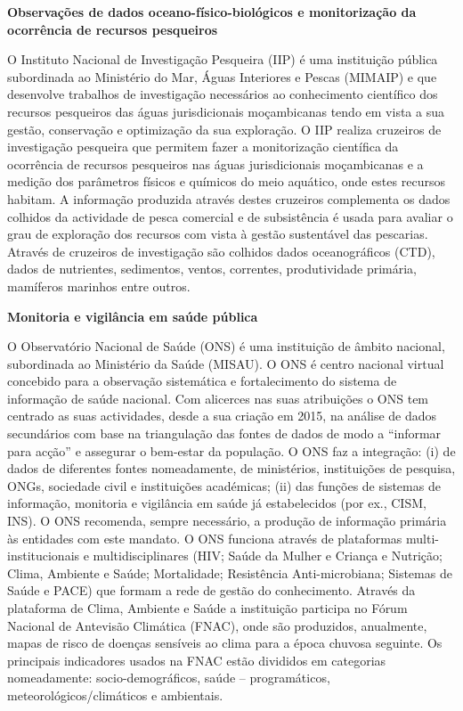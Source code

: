 \documentclass[
]{book}
\begin{document}
\textbf{Observações de dados oceano-físico-biológicos e monitorização da ocorrência de recursos pesqueiros}

O Instituto Nacional de Investigação Pesqueira (IIP) é uma instituição pública subordinada ao Ministério do Mar, Águas Interiores e Pescas (MIMAIP) e que desenvolve trabalhos de investigação necessários ao conhecimento científico dos recursos pesqueiros das águas jurisdicionais moçambicanas tendo em vista a sua gestão, conservação e optimização da sua exploração. O IIP realiza cruzeiros de investigação pesqueira que permitem fazer a monitorização científica da ocorrência de recursos pesqueiros nas águas jurisdicionais moçambicanas e a medição dos parâmetros físicos e químicos do meio aquático, onde estes recursos habitam. A informação produzida através destes cruzeiros complementa os dados colhidos da actividade de pesca comercial e de subsistência é usada para avaliar o grau de exploração dos recursos com vista à gestão sustentável das pescarias. Através de cruzeiros de investigação são colhidos dados oceanográficos (CTD), dados de nutrientes, sedimentos, ventos, correntes, produtividade primária, mamíferos marinhos entre outros.

\textbf{Monitoria e vigilância em saúde pública}

O Observatório Nacional de Saúde (ONS) é uma instituição de âmbito nacional, subordinada ao Ministério da Saúde (MISAU). O ONS é centro nacional virtual concebido para a observação sistemática e fortalecimento do sistema de informação de saúde nacional. Com alicerces nas suas atribuições o ONS tem centrado as suas actividades, desde a sua criação em 2015, na análise de dados secundários com base na triangulação das fontes de dados de modo a ``informar para acção'' e assegurar o bem-estar da população. O ONS faz a integração: (i) de dados de diferentes fontes nomeadamente, de ministérios, instituições de pesquisa, ONGs, sociedade civil e instituições académicas; (ii) das funções de sistemas de informação, monitoria e vigilância em saúde já estabelecidos (por ex., CISM, INS). O ONS recomenda, sempre necessário, a produção de informação primária às entidades com este mandato. O ONS funciona através de plataformas multi-institucionais e multidisciplinares (HIV; Saúde da Mulher e Criança e Nutrição; Clima, Ambiente e Saúde; Mortalidade; Resistência Anti-microbiana; Sistemas de Saúde e PACE) que formam a rede de gestão do conhecimento. Através da plataforma de Clima, Ambiente e Saúde a instituição participa no Fórum Nacional de Antevisão Climática (FNAC), onde são produzidos, anualmente, mapas de risco de doenças sensíveis ao clima para a época chuvosa seguinte. Os principais indicadores usados na FNAC estão divididos em categorias nomeadamente: socio-demográficos, saúde -- programáticos, meteorológicos/climáticos e ambientais.
\end{document}
